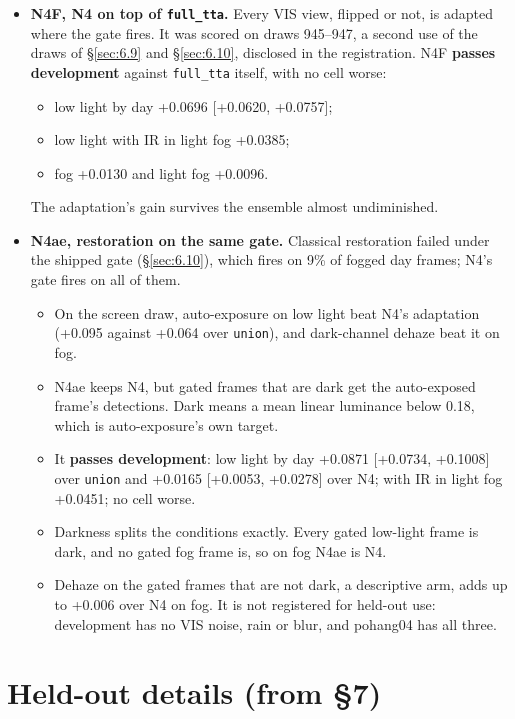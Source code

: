 \documentclass[10pt]{article}
\begin{document}
\begin{itemize}
\item \textbf{N4F, N4 on top of \texttt{full\_\allowbreak{}tta}.} Every VIS view, flipped or not, is adapted where the gate fires. It was scored on draws 945--947, a second use of the draws of \S\ref{sec:6.9} and \S\ref{sec:6.10}, disclosed in the registration. N4F \textbf{passes development} against \texttt{full\_\allowbreak{}tta} itself, with no cell worse:
\begin{itemize}
\item low light by day +0.0696 [+0.0620, +0.0757];
\item low light with IR in light fog +0.0385;
\item fog +0.0130 and light fog +0.0096.
\end{itemize}
The adaptation's gain survives the ensemble almost undiminished.
\item \textbf{N4ae, restoration on the same gate.} Classical restoration failed under the shipped gate (\S\ref{sec:6.10}), which fires on 9\% of fogged day frames; N4's gate fires on all of them.
\begin{itemize}
\item On the screen draw, auto-exposure on low light beat N4's adaptation (+0.095 against +0.064 over \texttt{union}), and dark-channel dehaze \citep{he2011single} beat it on fog.
\item N4ae keeps N4, but gated frames that are dark get the auto-exposed frame's detections. Dark means a mean linear luminance below 0.18, which is auto-exposure's own target.
\item It \textbf{passes development}: low light by day +0.0871 [+0.0734, +0.1008] over \texttt{union} and +0.0165 [+0.0053, +0.0278] over N4; with IR in light fog +0.0451; no cell worse.
\item Darkness splits the conditions exactly. Every gated low-light frame is dark, and no gated fog frame is, so on fog N4ae is N4.
\item Dehaze on the gated frames that are not dark, a descriptive arm, adds up to +0.006 over N4 on fog. It is not registered for held-out use: development has no VIS noise, rain or blur, and pohang04 has all three.
\end{itemize}
\end{itemize}

\FloatBarrier
\section{Held-out details (from \S7)}\label{app:K}
\end{document}
